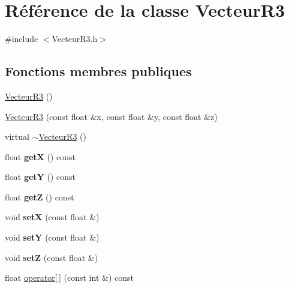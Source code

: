 \hypertarget{class_vecteur_r3}{}\section{Référence de la classe Vecteur\+R3}
\label{class_vecteur_r3}


{\ttfamily \#include $<$Vecteur\+R3.\+h$>$}

\subsection*{Fonctions membres publiques}
\begin{DoxyCompactItemize}
\item 
\mbox{\hyperlink{class_vecteur_r3_a265cb675642abf1db0fbd99eed4590e7}{Vecteur\+R3}} ()
\item 
\mbox{\hyperlink{class_vecteur_r3_a86df8062a0522098bac7c2f18e97f2a3}{Vecteur\+R3}} (const float \&x, const float \&y, const float \&z)
\item 
virtual \mbox{\hyperlink{class_vecteur_r3_a75a59c365109680a59e84db71faf8eb9}{$\sim$\+Vecteur\+R3}} ()
\item 
\mbox{\label{class_vecteur_r3_a715d8803e29c9c588f763ed2d7227f42}} 
float {\bfseries getX} () const
\item 
\mbox{\label{class_vecteur_r3_a5f019e331867afdb05cac782bb14e9e9}} 
float {\bfseries getY} () const
\item 
\mbox{\label{class_vecteur_r3_a144eb3201fcb8235f86ea56fbe60898f}} 
float {\bfseries getZ} () const
\item 
\mbox{\label{class_vecteur_r3_a2d5f95e3b84ce304f46750e4d7d32505}} 
void {\bfseries setX} (const float \&)
\item 
\mbox{\label{class_vecteur_r3_a4ef6cac63a9a31d071dacea892129e47}} 
void {\bfseries setY} (const float \&)
\item 
\mbox{\label{class_vecteur_r3_a8266502ca7bdc70ec97672520f34b85f}} 
void {\bfseries setZ} (const float \&)
\item 
float \mbox{\hyperlink{class_vecteur_r3_afb4fb3f4cd023a67cb74e906117ca30c}{operator\mbox{[}$\,$\mbox{]}}} (const int \&) const

\end{DoxyCompactItemize}
